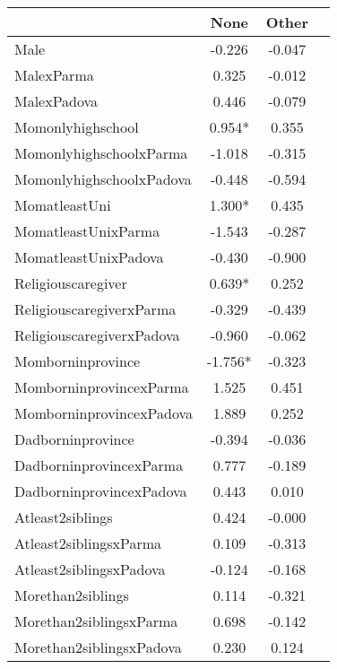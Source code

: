 \begin{tabular}{l c c c}
\toprule
& None & Other \\
\midrule
Male &    -0.226 &    -0.047 \\
MalexParma &     0.325 &    -0.012 \\
MalexPadova &     0.446 &    -0.079 \\
Momonlyhighschool & 0.954* &     0.355 \\
MomonlyhighschoolxParma &    -1.018 &    -0.315 \\
MomonlyhighschoolxPadova &    -0.448 &    -0.594 \\
MomatleastUni & 1.300* &     0.435 \\
MomatleastUnixParma &    -1.543 &    -0.287 \\
MomatleastUnixPadova &    -0.430 &    -0.900 \\
Religiouscaregiver & 0.639* &     0.252 \\
ReligiouscaregiverxParma &    -0.329 &    -0.439 \\
ReligiouscaregiverxPadova &    -0.960 &    -0.062 \\
Momborninprovince & -1.756* &    -0.323 \\
MomborninprovincexParma &     1.525 &     0.451 \\
MomborninprovincexPadova &     1.889 &     0.252 \\
Dadborninprovince &    -0.394 &    -0.036 \\
DadborninprovincexParma &     0.777 &    -0.189 \\
DadborninprovincexPadova &     0.443 &     0.010 \\
Atleast2siblings &     0.424 &    -0.000 \\
Atleast2siblingsxParma &     0.109 &    -0.313 \\
Atleast2siblingsxPadova &    -0.124 &    -0.168 \\
Morethan2siblings &     0.114 &    -0.321 \\
Morethan2siblingsxParma &     0.698 &    -0.142 \\
Morethan2siblingsxPadova &     0.230 &     0.124 \\
\bottomrule
\end{tabular}

